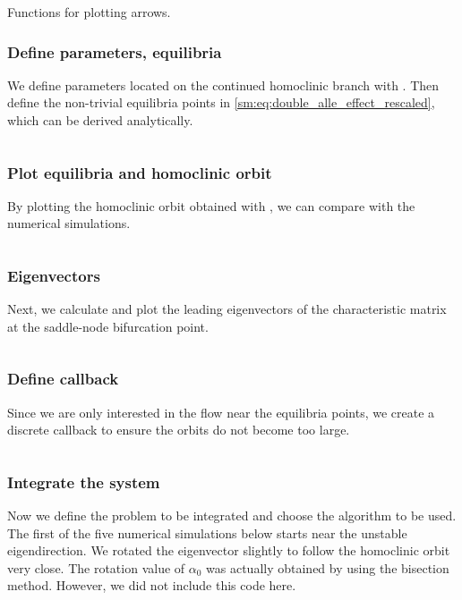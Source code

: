 \begin{code}
\inputminted[firstline=40, lastline=71]{julia}{\pathToJuliaFiles/predator_prey_simulation_article.jl}
\caption{Functions for plotting arrows.}
\label{sm:lst:arrow_fucntions}
\end{code}

\subsubsection{Define parameters, equilibria}
We define parameters located on the continued homoclinic branch with
\DDEBIFTOOL. Then define the non-trivial equilibria points in
\cref{sm:eq:double_alle_effect_rescaled}, which can be derived analytically.
\inputminted[firstline=73, lastline=80]{julia}{\pathToJuliaFiles/predator_prey_simulation_article.jl}

\subsubsection{Plot equilibria and homoclinic orbit}
By plotting the homoclinic orbit obtained with \DDEBIFTOOL, we can compare with the numerical simulations. 
\inputminted[firstline=82, lastline=91]{julia}{\pathToJuliaFiles/predator_prey_simulation_article.jl}

\subsubsection{Eigenvectors}
Next, we calculate and plot the leading eigenvectors of the characteristic matrix at the saddle-node bifurcation point.
\inputminted[firstline=93, lastline=105]{julia}{\pathToJuliaFiles/predator_prey_simulation_article.jl}

\subsubsection{Define callback}
Since we are only interested in the flow near the equilibria points, we create a
discrete callback to ensure the orbits do not become too large.
\inputminted[firstline=107, lastline=110]{julia}{\pathToJuliaFiles/predator_prey_simulation_article.jl}

\subsubsection{Integrate the system}
Now we define the problem to be integrated and choose the algorithm to be used.
The first of the five numerical simulations below starts near the unstable
eigendirection. We rotated the eigenvector slightly to follow the homoclinic
orbit very close. The rotation value of $\alpha_0$ was actually obtained by using
the bisection method. However, we did not include this code here. 
\inputminted[firstline=112, lastline=147]{julia}{\pathToJuliaFiles/predator_prey_simulation_article.jl}

